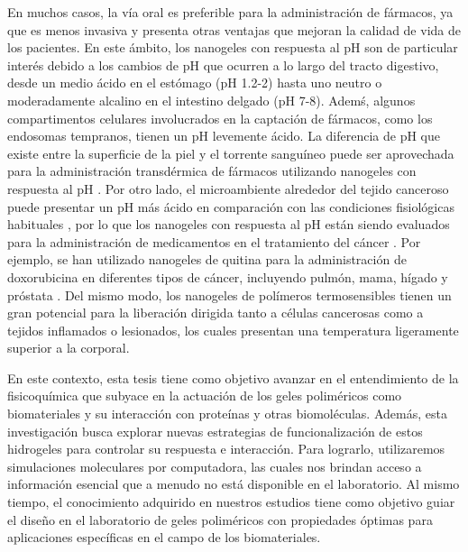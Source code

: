 En muchos casos, la v\'ia oral es preferible para la administraci\'on de f\'armacos, ya que es menos invasiva y presenta otras ventajas que mejoran la calidad de vida de los pacientes. En este \'ambito, los nanogeles con respuesta al pH son de particular inter\'es debido a los cambios de pH que ocurren a lo largo del tracto digestivo, desde un medio \'acido en el est\'omago (pH 1.2-2) hasta uno neutro o moderadamente alcalino en el intestino delgado (pH 7-8). Adem\'s, algunos compartimentos celulares involucrados en la captaci\'on de f\'armacos, como los endosomas tempranos, tienen un pH levemente \'acido. La diferencia de pH que existe entre la superficie de la piel  y el torrente sangu\'ineo puede ser aprovechada para la administraci\'on transd\'ermica de f\'armacos utilizando nanogeles con respuesta al pH \cite{qindeel2019development}. Por otro lado, el microambiente alrededor del tejido canceroso puede presentar un pH m\'as \'acido en comparaci\'on con las condiciones fisiol\'ogicas habituales \cite{lawson1963breast,tannock1989acid,gerweck2006tumor}, por lo que los nanogeles con respuesta al pH est\'an siendo evaluados para la administraci\'on de medicamentos en el tratamiento del c\'ancer \cite{peng2013controlled,kanamala2016mechanisms}. Por ejemplo, se han utilizado nanogeles de quitina para la administraci\'on de doxorubicina en diferentes tipos de c\'ancer, incluyendo pulm\'on, mama, h\'igado y pr\'ostata \cite{jayakumar2012doxorubicin}. Del mismo modo, los nanogeles de pol\'imeros termosensibles tienen un gran potencial para la liberaci\'on dirigida tanto a c\'elulas cancerosas como a tejidos inflamados o lesionados, los cuales presentan una temperatura ligeramente superior a la corporal.
	
En este contexto, esta tesis tiene como objetivo avanzar en el entendimiento de la fisicoqu\'imica que subyace en la actuaci\'on de los geles polim\'ericos como biomateriales y su interacci\'on con prote\'inas y otras biomol\'eculas. Adem\'as, esta investigaci\'on busca explorar nuevas estrategias de funcionalizaci\'on de estos hidrogeles para controlar su respuesta e interacci\'on. Para lograrlo, utilizaremos simulaciones moleculares por computadora, las cuales nos brindan acceso a informaci\'on esencial que a menudo no est\'a disponible en el laboratorio. Al mismo tiempo, el conocimiento adquirido en nuestros estudios tiene como objetivo guiar el dise\~no en el laboratorio de geles polim\'ericos con propiedades \'optimas para aplicaciones espec\'ificas en el campo de los biomateriales.


